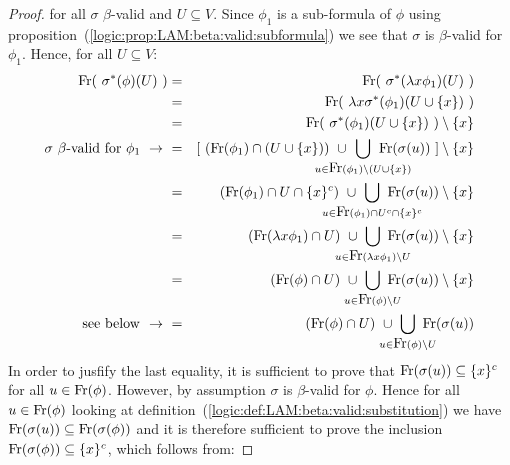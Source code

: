 \begin{proof}
    for all $\sigma$ $\beta$-valid and $U\subseteq V$. Since $\phi_{1}$ is 
    a sub-formula of $\phi$ using 
    proposition~(\ref{logic:prop:LAM:beta:valid:subformula}) we see that 
    $\sigma$ is $\beta$-valid for $\phi_{1}$. Hence, for all $U\subseteq V$:
    \begin{eqnarray*}
        \free(\ \sigma^{*}(\phi)(U)\ )
        &=&\free(\ \sigma^{*}(\lambda x\phi_{1})(U)\ )\\
        &=&\free(\ \lambda x\sigma^{*}(\phi_{1})(U\cup\{x\})\ )\\
        &=&\free(\ \sigma^{*}(\phi_{1})(U\cup\{x\})\ )\setminus\{x\}\\
        \mbox{$\sigma$ $\beta$-valid for $\phi_{1}\ \rightarrow\ $}
        &=& [\ (\free(\phi_{1})\cap(U\cup\{x\}))
        \ \cup\ 
        \!\!\!\!\!\!\!\!\!\!\!\!\!\!\!\!\!
        \bigcup_{u\in\free(\phi_{1})\setminus(U\cup\{x\})}
        \!\!\!\!\!\!\!\!\!\!\!\!\!\!\!
        \free(\sigma(u))
        \ ]\setminus\{x\}\\
        &=&(\free(\phi_{1})\cap U\cap \{x\}^{c})
        \ \cup\ 
        \!\!\!\!\!\!\!\!\!\!\!\!\!\!\!\!\!\!
        \bigcup_{u\in\free(\phi_{1})\cap U^{c}\cap\{x\}^{c}}
        \!\!\!\!\!\!\!\!\!\!\!\!\!\!\!\!
        \free(\sigma(u))\setminus\{x\}\\
        &=&(\free(\lambda x\phi_{1})\cap U)
        \ \cup\ 
        \!\!\!\!\!\!\!\!\!\!\!\!\!
        \bigcup_{u\in\free(\lambda x\phi_{1})\setminus U}
        \!\!\!\!\!\!\!\!\!\!\!
        \free(\sigma(u))\setminus\{x\}\\
        &=&(\free(\phi)\cap U)
        \ \cup\ 
        \!\!\!\!\!\!\!\!\!
        \bigcup_{u\in\free(\phi)\setminus U} 
        \!\!\!\!\!\!\!
        \free(\sigma(u))\setminus\{x\}\\
        \mbox{see below $\ \rightarrow\ $}
        &=&(\free(\phi)\cap U)
        \ \cup\ 
        \!\!\!\!\!\!\!\!\!
        \bigcup_{u\in\free(\phi)\setminus U}
        \!\!\!\!\!\!\!
        \free(\sigma(u))
    \end{eqnarray*}
    In order to jusfify the last equality, it is sufficient to prove
    that $\mbox{\rm Fr}(\sigma(u))\subseteq\{x\}^{c}$ for all $u\in\mbox{\rm Fr}(\phi)$.
    However, by assumption $\sigma$ is $\beta$-valid for $\phi$. Hence
    for all $u\in\mbox{\rm Fr}(\phi)$ looking at 
    definition~(\ref{logic:def:LAM:beta:valid:substitution}) we have 
    $\mbox{\rm Fr}(\sigma(u))\subseteq\mbox{\rm Fr}(\sigma(\phi))$ and it is therefore 
    sufficient to prove the inclusion $\mbox{\rm Fr}(\sigma(\phi))\subseteq\{x\}^{c}$,
    which follows from:

\end{proof}
